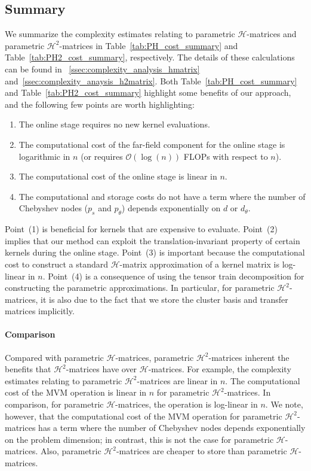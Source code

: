 \documentclass[final,3p,times]{elsarticle}
\newcommand{\mc}[1]{\mathcal{#1}}
\begin{document}
\subsection{Summary}
We summarize the complexity estimates relating to parametric $\mc{H}$-matrices and parametric $\mc{H}^{2}$-matrices in Table~\ref{tab:PH_cost_summary} and Table~\ref{tab:PH2_cost_summary}, respectively. The details of these calculations can be found in ~\ref{ssec:complexity_analysis_hmatrix} and~\ref{ssec:complexity_anaysis_h2matrix}.   Both Table~\ref{tab:PH_cost_summary} and Table~\ref{tab:PH2_cost_summary} highlight some benefits of our approach, and the following few points are worth highlighting:  
\begin{enumerate}
    \item The online stage requires no new kernel evaluations.
    \item The computational cost of the far-field component for the online stage is  logarithmic in $n$ (or requires $\mc{O}(\log(n))$ FLOPs with respect to $n$).
    \item The computational cost of the online stage is  linear in $n$.
    \item The computational and storage costs do not  have a term where the number of Chebyshev nodes  ($p_s$ and $p_{\theta}$) depends exponentially on $d$ or $d_{\theta}$.
\end{enumerate}
Point~(1) is beneficial for kernels that are expensive to evaluate. Point~(2) implies that our method can exploit the translation-invariant property of certain kernels during the online stage.  Point~(3) is important because the computational cost to construct a standard $\mc{H}$-matrix approximation of a kernel matrix is  log-linear in $n$. Point~(4) is  a consequence of using the tensor train decomposition for constructing the parametric approximations. In particular, for parametric $\mc{H}^{2}$-matrices, it is also due to the fact that we store the cluster basis and transfer matrices implicitly.


\paragraph{Comparison}
Compared with parametric $\mc{H}$-matrices, parametric $\mc{H}^{2}$-matrices inherent the benefits that $\mc{H}^{2}$-matrices have over $\mc{H}$-matrices. For example, the complexity estimates relating to parametric $\mc{H}^{2}$-matrices are  linear in $n$. The computational cost of the MVM operation is  linear in $n$ for parametric $\mc{H}^{2}$-matrices. In comparison, for parametric $\mc{H}$-matrices, the operation is  log-linear in $n$. We note, however, that the computational cost of the MVM operation for parametric $\mc{H}^{2}$-matrices has a term where the number of Chebyshev nodes depends exponentially on the problem dimension; in contrast, this is not the case for parametric $\mc{H}$-matrices. Also,  parametric $\mc{H}^2$-matrices are cheaper to store than  parametric $\mc{H}$-matrices. 
\end{document}
